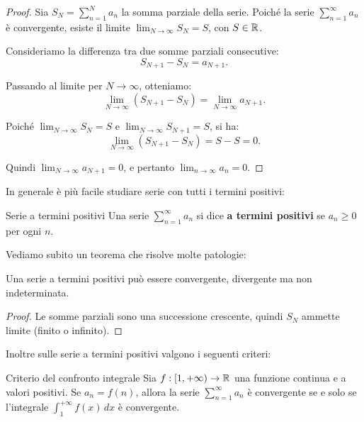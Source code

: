 \begin{proof}
  Sia $S_N = \sum_{n=1}^{N} a_n$ la somma parziale della serie. Poiché la serie $\sum_{n=1}^{\infty} a_n$ è convergente, esiste il limite $\lim_{N \to \infty} S_N = S$, con $S \in \mathbb{R}$.

  Consideriamo la differenza tra due somme parziali consecutive:
  \[
  S_{N+1} - S_N = a_{N+1}.
  \]

  Passando al limite per $N \to \infty$, otteniamo:
  \[
  \lim_{N \to \infty} (S_{N+1} - S_N) = \lim_{N \to \infty} a_{N+1}.
  \]

  Poiché $\lim_{N \to \infty} S_N = S$ e $\lim_{N \to \infty} S_{N+1} = S$, si ha:
  \[
  \lim_{N \to \infty} (S_{N+1} - S_N) = S - S = 0.
  \]

  Quindi $\lim_{N \to \infty} a_{N+1} = 0$, e pertanto $\lim_{n \to \infty} a_n = 0$.
\end{proof}

In generale è più facile studiare serie con tutti i termini positivi:
\begin{definizione}{Serie a termini positivi}
  Una serie $\sum_{n=1}^{\infty} a_n$ si dice \textbf{a termini positivi} se $a_n \geq 0$ per ogni $n$.
\end{definizione}

Vediamo subito un teorema che risolve molte patologie:
\begin{teorema}{}
  Una serie a termini positivi può essere convergente, divergente ma non indeterminata.\\
\end{teorema}

\begin{proof}
Le somme parziali sono una successione crescente, quindi $S_N$ ammette limite (finito o infinito).
\end{proof}
Inoltre sulle serie a termini positivi valgono i seguenti criteri:
\begin{teorema}{Criterio del confronto integrale}
  Sia $f:[1, +\infty) \to \mathbb{R}$ una funzione continua e a valori positivi. Se $a_n = f(n)$, allora la serie $\sum_{n=1}^{\infty} a_n$ è convergente se e solo se l'integrale $\int_{1}^{+\infty} f(x) \, dx$ è convergente.
\end{teorema}

